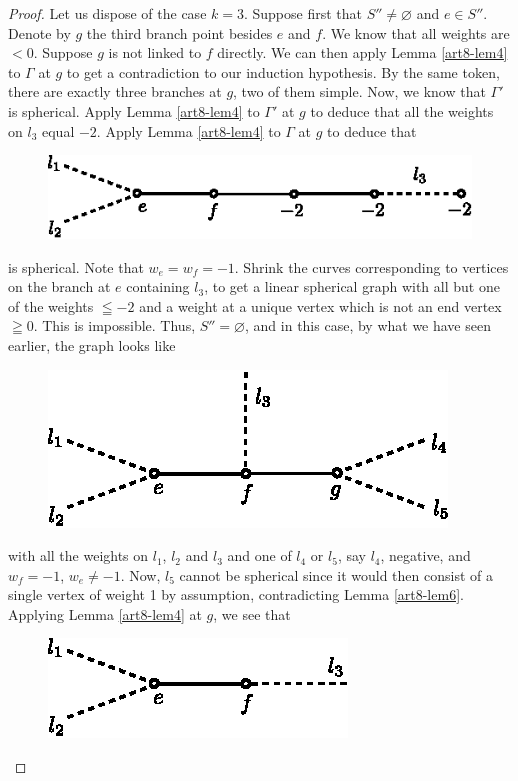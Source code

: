 \begin{proof}
Let us dispose of the case $k=3$. Suppose first that $S'' \neq \varnothing $ and $e \in S''$. Denote by $g$ the third branch point besides $e$ and $f$. We know that all weights are $<0$. Suppose $g$ is not linked to $f$ directly. We can then apply Lemma \ref{art8-lem4} to $\Gamma$ at $g$ to get a contradiction to our induction hypothesis. By the same token, there are exactly three branches at $g$, two of them simple. Now, we know that $\Gamma'$ is spherical. Apply Lemma \ref{art8-lem4} to $\Gamma'$ at $g$ to deduce that all the weights on $l_3$ equal $-2$. Apply Lemma \ref{art8-lem4} to $\Gamma$ at $g$ to deduce that 
\begin{figure}[H]
\centering
\includegraphics{fig17.eps}
\end{figure}
\noindent
is spherical. Note that $w_e = w_f = -1$. Shrink the curves corresponding to vertices on the branch at $e$ containing $l_3$, to get a linear spherical graph with all but one of the weights $\leqq -2$ and a weight at a unique vertex which is not an end vertex $\geqq 0 $. This is impossible. Thus, $S'' = \varnothing$, and in this case, by what we have seen earlier, the graph looks like
\begin{figure}[H]
\centering
\includegraphics{fig18.eps}
\end{figure}
\noindent
with all the weights on $l_1$, $l_2$ and $l_3$ and one of $l_4$ or $l_5$, say $l_4$, negative, and $w_f = -1$, $w_e \neq -1$. Now, $l_5$ cannot be spherical since it would then consist of a single vertex of weight 1 by assumption, contradicting Lemma \ref{art8-lem6}. Applying Lemma \ref{art8-lem4} at $g$, we see that 
\begin{figure}[H]
\centering
\includegraphics{fig19.eps}

\end{figure}
\end{proof}

